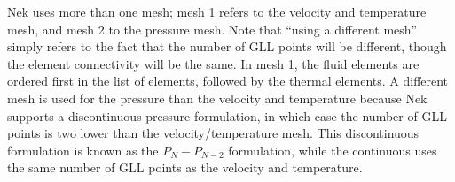 \documentclass[10pt]{article}
\numberwithin{equation}{section} %
\begin{document}
Nek uses more than one mesh; mesh 1 refers to the velocity and temperature mesh, and mesh 2 to the pressure mesh. Note that ``using a different mesh'' simply refers to the fact that the number of GLL points will be different, though the element connectivity will be the same. In mesh 1, the fluid elements are ordered first in the list of elements, followed by the thermal elements. A different mesh is used for the pressure than the velocity and temperature because Nek supports a discontinuous pressure formulation, in which case the number of GLL points is two lower than the velocity/temperature mesh. This discontinuous formulation is known as the \(P_N-P_{N-2}\) formulation, while the continuous uses the same number of GLL points as the velocity and temperature.

\end{document}
